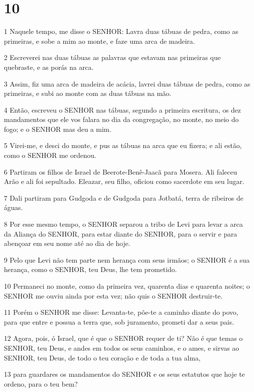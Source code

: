 \chapter{10}

\par 1 Naquele tempo, me disse o SENHOR: Lavra duas tábuas de pedra, como as primeiras, e sobe a mim ao monte, e faze uma arca de madeira.
\par 2 Escreverei nas duas tábuas as palavras que estavam nas primeiras que quebraste, e as porás na arca.
\par 3 Assim, fiz uma arca de madeira de acácia, lavrei duas tábuas de pedra, como as primeiras, e subi ao monte com as duas tábuas na mão.
\par 4 Então, escreveu o SENHOR nas tábuas, segundo a primeira escritura, os dez mandamentos que ele vos falara no dia da congregação, no monte, no meio do fogo; e o SENHOR mas deu a mim.
\par 5 Virei-me, e desci do monte, e pus as tábuas na arca que eu fizera; e ali estão, como o SENHOR me ordenou.
\par 6 Partiram os filhos de Israel de Beerote-Benê-Jaacã para Mosera. Ali faleceu Arão e ali foi sepultado. Eleazar, seu filho, oficiou como sacerdote em seu lugar.
\par 7 Dali partiram para Gudgoda e de Gudgoda para Jotbatá, terra de ribeiros de águas.
\par 8 Por esse mesmo tempo, o SENHOR separou a tribo de Levi para levar a arca da Aliança do SENHOR, para estar diante do SENHOR, para o servir e para abençoar em seu nome até ao dia de hoje.
\par 9 Pelo que Levi não tem parte nem herança com seus irmãos; o SENHOR é a sua herança, como o SENHOR, teu Deus, lhe tem prometido.
\par 10 Permaneci no monte, como da primeira vez, quarenta dias e quarenta noites; o SENHOR me ouviu ainda por esta vez; não quis o SENHOR destruir-te.
\par 11 Porém o SENHOR me disse: Levanta-te, põe-te a caminho diante do povo, para que entre e possua a terra que, sob juramento, prometi dar a seus pais.
\par 12 Agora, pois, ó Israel, que é que o SENHOR requer de ti? Não é que temas o SENHOR, teu Deus, e andes em todos os seus caminhos, e o ames, e sirvas ao SENHOR, teu Deus, de todo o teu coração e de toda a tua alma,
\par 13 para guardares os mandamentos do SENHOR e os seus estatutos que hoje te ordeno, para o teu bem?

